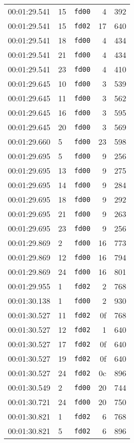 \documentclass{article}
\begin{document}
\begin{longtable}{lllrr}
00:01:29.541 & 15 & \texttt{fd00} & 4 & 392 \\
00:01:29.541 & 15 & \texttt{fd02} & 17 & 640 \\
00:01:29.541 & 18 & \texttt{fd00} & 4 & 434 \\
00:01:29.541 & 21 & \texttt{fd00} & 4 & 434 \\
00:01:29.541 & 23 & \texttt{fd00} & 4 & 410 \\
00:01:29.645 & 10 & \texttt{fd00} & 3 & 539 \\
00:01:29.645 & 11 & \texttt{fd00} & 3 & 562 \\
00:01:29.645 & 16 & \texttt{fd00} & 3 & 595 \\
00:01:29.645 & 20 & \texttt{fd00} & 3 & 569 \\
00:01:29.660 & 5 & \texttt{fd00} & 23 & 598 \\
00:01:29.695 & 5 & \texttt{fd00} & 9 & 256 \\
00:01:29.695 & 13 & \texttt{fd00} & 9 & 275 \\
00:01:29.695 & 14 & \texttt{fd00} & 9 & 284 \\
00:01:29.695 & 18 & \texttt{fd00} & 9 & 292 \\
00:01:29.695 & 21 & \texttt{fd00} & 9 & 263 \\
00:01:29.695 & 23 & \texttt{fd00} & 9 & 256 \\
00:01:29.869 & 2 & \texttt{fd00} & 16 & 773 \\
00:01:29.869 & 12 & \texttt{fd00} & 16 & 794 \\
00:01:29.869 & 24 & \texttt{fd00} & 16 & 801 \\
00:01:29.955 & 1 & \texttt{fd02} & 2 & 768 \\
00:01:30.138 & 1 & \texttt{fd00} & 2 & 930 \\
00:01:30.527 & 11 & \texttt{fd02} & 0f & 768 \\
00:01:30.527 & 12 & \texttt{fd02} & 1 & 640 \\
00:01:30.527 & 17 & \texttt{fd02} & 0f & 640 \\
00:01:30.527 & 19 & \texttt{fd02} & 0f & 640 \\
00:01:30.527 & 24 & \texttt{fd02} & 0c & 896 \\
00:01:30.549 & 2 & \texttt{fd00} & 20 & 744 \\
00:01:30.721 & 24 & \texttt{fd00} & 20 & 750 \\
00:01:30.821 & 1 & \texttt{fd02} & 6 & 768 \\
00:01:30.821 & 5 & \texttt{fd02} & 6 & 896 \\

\end{longtable}
\end{document}

